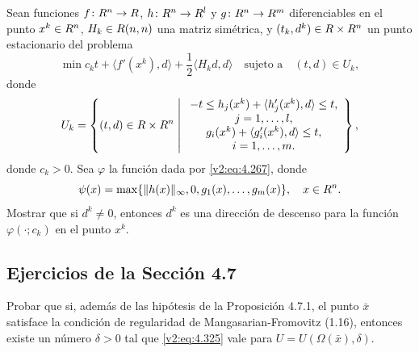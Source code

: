 \begin{exercise}\label{v2:ejer:4.6.4}
    Sean funciones $f \colon R^n \to R$, $h \colon R^n \to R^l$ y $g \colon R^n \to R^m$ diferenciables en el punto $x^k \in R^n$, $H_k \in R(n, n)$ una matriz simétrica, y $(t_k, d^k) \in R \times R^n$ un punto estacionario del problema
    \[
        \min c_k t + \langle f'(x^k), d \rangle + \frac{1}{2}\langle H_k d, d \rangle \quad \text{sujeto a} \quad (t, d) \in U_k,
    \]
    donde
    \[
        U_k = \left\{ (t, d) \in R \times R^n \;\middle|\; \begin{array}{c} -t \le h_j(x^k) + \langle h'_j(x^k), d \rangle \le t, \\ j = 1, \dots, l, \\ g_i(x^k) + \langle g'_i(x^k), d \rangle \le t, \\ i = 1, \dots, m. \end{array} \right\},
    \]
    donde $c_k > 0$. Sea $\varphi$ la función dada por \eqref{v2:eq:4.267}, donde
    \[
        \psi(x) = \max\{\|h(x)\|_\infty, 0, g_1(x), \dots, g_m(x)\}, \quad x \in R^n.
    \]
    Mostrar que si $d^k \neq 0$, entonces $d^k$ es una dirección de descenso para la función $\varphi(\cdot; c_k)$ en el punto $x^k$.
\end{exercise}

\subsection*{Ejercicios de la Sección 4.7}

\begin{exercise}\label{v2:ejer:4.7.1}
    Probar que si, además de las hipótesis de la Proposición 4.7.1, el punto $\bar{x}$ satisface la condición de regularidad de Mangasarian-Fromovitz (1.16), entonces existe un número $\delta > 0$ tal que \eqref{v2:eq:4.325} vale para $U = U(\Omega(\bar{x}), \delta)$.
\end{exercise}
